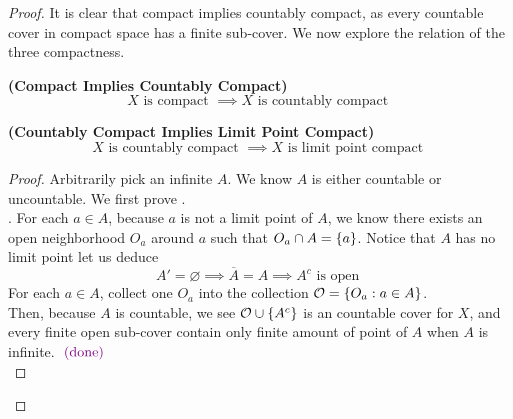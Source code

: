 \documentclass{report}
\begin{document}
\begin{proof}
{\begin{minipage}{39em}
It is clear that compact implies countably compact, as every countable cover in compact space has a finite sub-cover. We now explore the relation of the three compactness.
\end{minipage}}
\begin{theorem}
\label{2.6.6}
\textbf{(Compact Implies Countably Compact)} 
\begin{equation}
 X\text{ is compact }\implies X\text{ is countably compact }
\end{equation}
\end{theorem}
\begin{theorem}
\label{2.6.7}
\textbf{(Countably Compact Implies Limit Point Compact)} 
\begin{equation}
X\text{ is countably compact }\implies X\text{ is limit point compact }
\end{equation}
\end{theorem}
\begin{proof}
Arbitrarily pick an infinite $A$. We know  $A$ is either countable or uncountable. We first prove  .\\

. For each $a\in A$, because $a$ is not a limit point of $A$, we know there exists an open neighborhood  $O_a$ around $a$ such that  $O_a\cap A=\{ a \}$. Notice that $A$ has no limit point let us deduce
\begin{equation}
A'=\varnothing \implies \overline{A}=A\implies A^c\text{ is open }
\end{equation}
For each $a\in A$, collect one $O_a$ into the collection $\mathcal{O}=\{ O_a:a\in A \}$.\\

Then, because $A$ is countable, we see $\mathcal{O}\cup \{ A^c \}$ is an countable cover for $X$, and every finite open sub-cover contain only finite amount of point of $A$ when  $A$ is infinite. \CaC $\textcolor{violet}{\text{ (done) }}$\\


\end{proof}
\end{proof}
\end{document}
